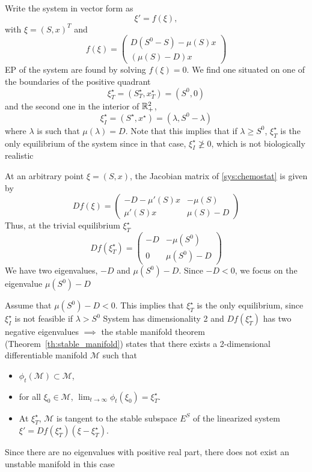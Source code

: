 \documentclass[aspectratio=169]{beamer}
\begin{document}
\begin{frame}
Write the system in vector form as
\[
\xi'=f(\xi),
\]
with $\xi=(S,x)^T$ and
\[
f(\xi)=
\begin{pmatrix}
D(S^0-S)-\mu(S)x \\
(\mu(S)-D)x
\end{pmatrix}
\]
EP of the system are found by solving $f(\xi)=0$. We find one situated on one of the boundaries of the positive quadrant
\[
\xi_T^\star=(S^\star_T,x^\star_T)=\left(S^0,0\right)
\]
and the second one in the interior of $\mathbb{R}_+^2$,
\[
\xi_I^\star=(S^\star,x^\star)=\left(\lambda,S^0-\lambda\right)
\]
where $\lambda$ is such that $\mu(\lambda)=D$. Note that this implies
that if $\lambda\geq S^0$, $\xi_T^\star$ is the only equilibrium of the
system since in that case, $\xi_I^\star\not\geq 0$, which is not biologically realistic
\end{frame}

\begin{frame}
At an arbitrary point $\xi=(S,x)$, the Jacobian matrix of \eqref{sys:chemostat} is given by
\[
Df(\xi)=\left(
\begin{matrix}
-D-\mu'(S)x & -\mu(S) \\
\mu'(S)x & \mu(S)-D
\end{matrix}
\right)
\]
\vfill
Thus, at the trivial equilibrium $\xi_T^\star$
\[
Df(\xi_T^\star)=
\left(
\begin{matrix}
-D & -\mu(S^0) \\
0 & \mu(S^0)-D
\end{matrix}
\right)
\]
\vfill
We have two eigenvalues, $-D$ and $\mu(S^0)-D$.
Since $-D<0$, we focus on the eigenvalue $\mu(S^0)-D$
\end{frame}

\begin{frame}
Assume that
$\mu(S^0)-D<0$. This implies that $\xi_T^\star$ is the only
equilibrium, since $\xi_I^\star$ is not feasible
if $\lambda>S^0$
\vfill
System has dimensionality 2 and $Df(\xi_T^\star)$
has two negative eigenvalues $\implies$ the stable manifold theorem
(Theorem~\ref{th:stable_manifold}) states that there exists a
2-dimensional differentiable manifold $\mathcal{M}$ such that
\begin{itemize}
\item $\phi_t(\mathcal{M})\subset\mathcal{M}$,
\item for all $\xi_0\in\mathcal{M}$,
$\lim_{t\to\infty}\phi_t(\xi_0)=\xi_T^\star$.
\item At $\xi_T^\star$, $\mathcal{M}$ is tangent to the stable subspace
$E^S$ of the linearized system $\xi'=Df(\xi_T^\star)(\xi-\xi_T^\star)$.
\end{itemize}
Since there are no eigenvalues with positive real part, there does not
exist an unstable manifold in this case 
\end{frame}
\end{document}
